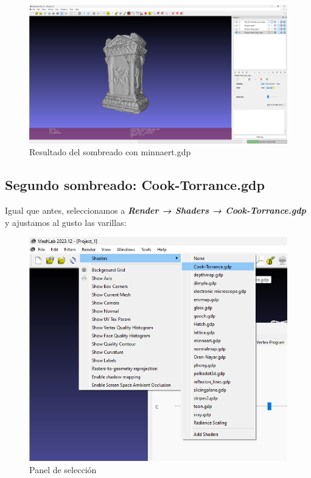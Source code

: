 \documentclass{article}
\begin{document}
\begin{figure}[H]
    \centering
    \includegraphics[scale=0.24]{images/sombras_03.png}
    \caption{Resultado del sombreado con minnaert.gdp}
\end{figure}

\pagebreak

\subsection{Segundo sombreado: Cook-Torrance.gdp}

Igual que antes, seleccionamos a \textbf{\textit{Render → Shaders → Cook-Torrance.gdp}} y ajustamos al gusto las varillas:

\begin{figure}[H]
    \centering
    \includegraphics[scale=0.55]{images/sombras_04.png}
    \caption{Panel de selección}
\end{figure}
\end{document}
